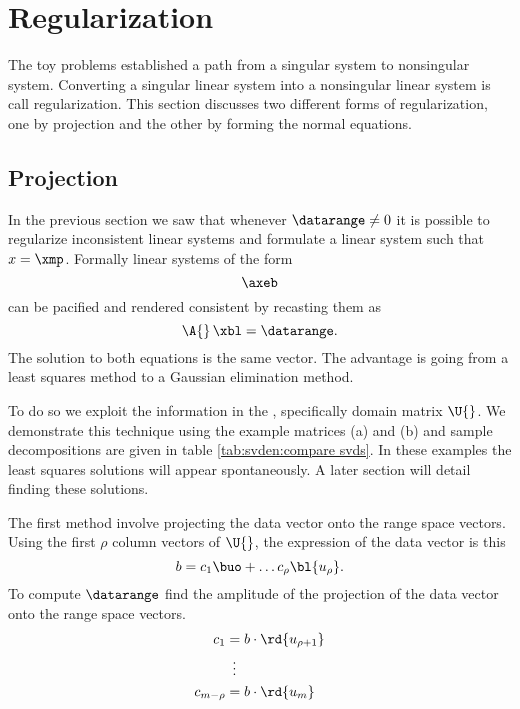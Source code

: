 \section{Regularization}
The toy problems established a path from a singular system to nonsingular system. Converting a singular linear system into a nonsingular linear system is call regularization. This section discusses two different forms of regularization, one by projection and the other by forming the normal equations.

\subsection{Projection}
In the previous section we saw that whenever $\datarange\ne0$ it is possible to regularize inconsistent linear systems and formulate a linear system such that $x=\xmp$. Formally linear systems of the form
\begin{equation*}
  \axeb
\end{equation*}
can be pacified and rendered consistent by recasting them as
\begin{equation*}
  \A{}\, \xbl = \datarange.
\end{equation*}
The solution to both equations is the same vector. The advantage is going from a least squares method to a Gaussian elimination method. 


To do so we exploit the information in the \asvd, specifically domain matrix $\U{}$. We demonstrate this technique using the example matrices (a) and (b) and sample decompositions are given in table \eqref{tab:svden:compare svds}. In these examples the least squares solutions will appear spontaneously. A later section will detail finding these solutions. 

The first method involve projecting the data vector onto the range space vectors. Using the first $\rho$ column vectors of $\U{}$, the expression of the data vector is this
\begin{equation}
  b = c_{1} \buo + \dots c_{\rho} {\bl{ u_{\rho} }}.
\end{equation}
To compute $\datarange$ find the amplitude of the projection of the data vector onto the range space vectors.
\begin{equation}
  \begin{split}
    c_{1} &= b \cdot {\rd{ u_{\rho+1} }} \\
          &\ \, \vdots \\
    c_{m-\rho} &= b \cdot {\rd{ u_{m} }}
  \end{split}
\end{equation}

